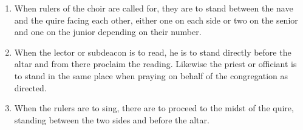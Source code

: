 \begin{enumerate}
			\item When rulers of the choir are called for, they are to stand between the nave and the quire facing each other, either one on each side or two on the senior and one on the junior depending on their number. 
			
			\item When the lector or subdeacon is to read, he is to stand directly before the altar and from there proclaim the reading. Likewise the priest or officiant is to stand in the same place when praying on behalf of the congregation as directed.
			
			\item When the rulers are to sing, there are to proceed to the midst of the quire, standing between the two sides and before the altar.
			
		\end{enumerate}
